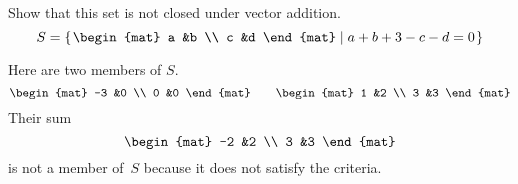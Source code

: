 \documentclass[noanswers, nolegalese, 11pt]{examjh}
\begin{document}
\begin{questions}
\question
Show that this set is not closed under vector addition.
\begin{equation*}
  S=\set{
    \begin{mat}
      a  &b \\
      c  &d
    \end{mat}
    \suchthat
    a+b+3-c-d=0}
\end{equation*}
\begin{solution}
Here are two members of $S$.
\begin{equation*}
\begin{mat}
  -3  &0 \\
  0   &0
\end{mat}
\qquad
\begin{mat}
  1 &2  \\
  3  &3
\end{mat}
\end{equation*}
Their sum
\begin{equation*}
\begin{mat}
  -2  &2  \\
   3  &3
\end{mat}
\end{equation*}
is not a member of~$S$
because it does not satisfy the criteria.
\end{solution}
\end{questions}
\end{document}

